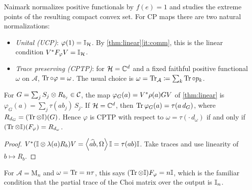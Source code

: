 \documentclass[12pt]{article}
\newcommand{\alg}{\mathcal{A}}             %
\newcommand{\hilb}{\mathcal{H}}            %
\newcommand{\Mn}[1]{\mathrm{M}_{#1}}       %
\newcommand{\ip}[2]{\left\langle #1 , #2 \right\rangle}
\newcommand{\vect}[1]{\widehat{#1}}
\newcommand{\Fphi}{F_{\varphi}}
\newcommand{\comm}{\mathcal{C}}            %
\begin{document}
Naimark normalizes positive functionals by \(f(e) = 1\) and studies the extreme
points of the resulting compact convex set. For CP maps there are two natural
normalizations:
\begin{itemize}
  \item \emph{Unital (UCP)}: \(\varphi(1) = \id_{\hilb}\). By
    \cref{thm:linear}\ref{it:comm}, this is the linear condition
    \(V^\adjoint\Fphi V = \id_{\hilb}\).
  \item \emph{Trace preserving (CPTP)}: for \(\hilb = \complex^d\) and a fixed faithful
    positive functional \(\omega\) on \(\alg\), \(\operatorname{Tr}\circ\varphi = \omega\). The
    usual choice is \(\omega = \trace_\alg \eqdef \sum_k \trace \compose p_k\).
\end{itemize}

\begin{lemma}
\label{lem:slice}
For \(G = \sum_j S_j \tensor R_{b_j} \in \comm\), the map
\(\varphi_G(a) = V^*\rho(a)GV\) of \cref{thm:linear} is
\(\varphi_G(a) = \sum_j \tau(ab_j)\,S_j\). If \(\hilb = \complex^d\), then
\(\operatorname{Tr}\varphi_G(a) = \tau(a\,d_G)\), where
\(R_{d_G} = (\operatorname{Tr} \otimes {\mathbb I})(G)\). Hence \(\varphi\) is CPTP with respect to
\(\omega = \tau(\cdot\,d_\omega)\) if and only if
\((\trace \tensor \id)(\Fphi) = R_{d_\omega}\).
\end{lemma}
\begin{proof}
\(V^\adjoint(\id \tensor \lambda(a)R_b)V = \ip{\vect{ab}}{\Omega}\id = \tau(ab)\id\).
Take traces and use linearity of \(b \mapsto R_b\).
\end{proof}

For \(\alg = \Mn n\) and \(\omega = \operatorname{Tr} = n\tau\), this says
\((\trace \tensor \id)\Fphi = n\id\), which is the familiar condition that the partial
trace of the Choi matrix over the output is \({\mathbb I}_n\).
\end{document}
